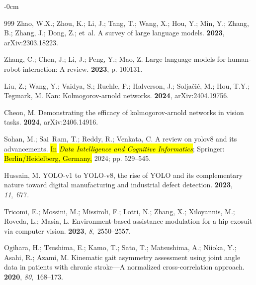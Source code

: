 \documentclass[actuators,article,accept,pdftex,moreauthors]{Definitions/mdpi}
\begin{document}
\begin{adjustwidth}{-\extralength}{0cm}
\begin{thebibliography}{999}
Zhao, W.X.; Zhou, K.; Li, J.; Tang, T.; Wang, X.; Hou, Y.; Min, Y.; Zhang, B.;
  Zhang, J.; Dong, Z.;  et~al.
\newblock A survey of large language models.
  {\bf 2023}, arXiv:2303.18223.

Zhang, C.; Chen, J.; Li, J.; Peng, Y.; Mao, Z.
\newblock Large language models for human-robot interaction: A review.
 {\bf 2023}, p. 100131.

Liu, Z.; Wang, Y.; Vaidya, S.; Ruehle, F.; Halverson, J.; Solja{\v{c}}i{\'c},
  M.; Hou, T.Y.; Tegmark, M.
\newblock Kan: Kolmogorov-arnold networks.
  {\bf 2024},  arXiv:2404.19756.

Cheon, M.
\newblock Demonstrating the efficacy of kolmogorov-arnold networks in vision
  tasks.
 {\bf 2024},  arXiv:2406.14916.

Sohan, M.; Sai~Ram, T.; Reddy, R.; Venkata, C.
\newblock A review on yolov8 and its advancements.
\newblock \hl{In} \emph{\hl{Data Intelligence and Cognitive Informatics}}; %
 Springer:  \hl{Berlin/Heidelberg, Germany,} %
  2024; pp. 529--545.

Hussain, M.
\newblock YOLO-v1 to YOLO-v8, the rise of YOLO and its complementary nature
  toward digital manufacturing and industrial defect detection.
 {\bf 2023}, {\em 11},~677.

Tricomi, E.; Mossini, M.; Missiroli, F.; Lotti, N.; Zhang, X.; Xiloyannis, M.;
  Roveda, L.; Masia, L.
\newblock Environment-based assistance modulation for a hip exosuit via
  computer vision.
 {\bf 2023}, {\em
  8},~2550--2557.

Ogihara, H.; Tsushima, E.; Kamo, T.; Sato, T.; Matsushima, A.; Niioka, Y.;
  Asahi, R.; Azami, M.
\newblock Kinematic gait asymmetry assessment using joint angle data in
  patients with chronic stroke—A normalized cross-correlation approach.
 {\bf 2020}, {\em 80},~168--173.


\end{thebibliography}
\end{adjustwidth}
\end{document}
